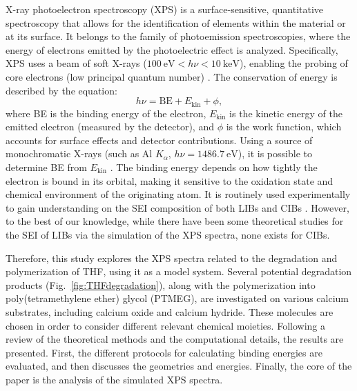 \documentclass[journal=jpccck,manuscript=article]{achemso}
\begin{document}
X-ray photoelectron spectroscopy (XPS) is a surface-sensitive, quantitative spectroscopy that allows for the identification of elements within the material or at its surface. It belongs to the family of photoemission spectroscopies, where the energy of electrons emitted by the photoelectric effect is analyzed. Specifically, XPS uses a beam of soft X-rays ($\SI{100}{\electronvolt} < h\nu < \SI{10}{\kilo\electronvolt}$), enabling the probing of core electrons (low principal quantum number) \cite{stevieIntroductionXrayPhotoelectron2020}. The conservation of energy is described by the equation:
\begin{equation}
	h\nu = \text{BE} + E_{\text{kin}} + \phi, \label{eq:xps}
\end{equation}
where BE is the binding energy of the electron, $E_{\text{kin}}$ is the kinetic energy of the emitted electron (measured by the detector), and $\phi$ is the work function, which accounts for surface effects and detector contributions. Using a source of monochromatic X-rays (such as Al $K_\alpha$, $h\nu = \SI{1486.7}{\electronvolt}$), it is possible to determine BE from $E_{\text{kin}}$ \cite{stevieIntroductionXrayPhotoelectron2020}. The binding energy depends on how tightly the electron is bound in its orbital, making it sensitive to the oxidation state and chemical environment of the originating atom. It is routinely used experimentally to gain understanding on the SEI composition of both LIBs and CIBs \cite{forero-saboyaUnderstandingNaturePassivation2020a,songElectrolyteOptimizationInterphase2022,bodinBoronBasedFunctionalAdditives2023,melemedImpactDifferentialCa22023,linDecipheringDynamicInterfacial2024}. However, to the best of our knowledge, while there have been some theoretical studies for the SEI of LIBs via the simulation of the XPS spectra\cite{ebadiInsightsLiMetalOrganic2019}, none exists for CIBs.

Therefore, this study explores the XPS spectra related to the degradation and polymerization of THF, using it as a model system. Several potential degradation products (Fig.~\ref{fig:THFdegradation}), along with the polymerization into poly(tetramethylene ether) glycol (PTMEG), are investigated on various calcium substrates, including calcium oxide and calcium hydride. These molecules are chosen in order to consider different relevant chemical moieties. Following a review of the theoretical methods and the computational details, the results are presented. First, the different protocols for calculating binding energies are evaluated, and then discusses the geometries and energies. Finally, the core of the paper is the analysis of the simulated XPS spectra.
\end{document}
